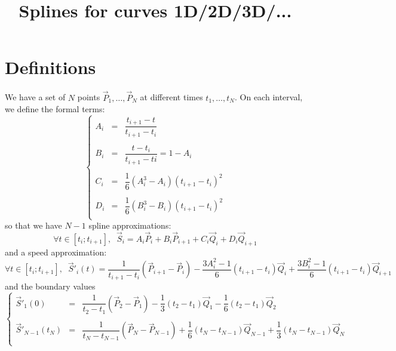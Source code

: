 \documentclass[aps,11pt]{revtex4}
\begin{document}
\title{Splines for curves 1D/2D/3D/...}
\maketitle

\section{Definitions}
We have a set of $N$ points $\vec{P}_1,\ldots,\vec{P}_N$ at different times $t_1,\ldots,t_N$.
On each interval, we define the formal terms:
\begin{equation}
\left\lbrace
\begin{array}{rcl}
	A_i & = &\dfrac{t_{i+1}-t}{t_{i+1}-t_{i}}\\
	\\
	B_i & = &\dfrac{t-t_{i}}{t_{i+1}-t{i}} = 1-A_i\\
	\\
	C_i & = & \dfrac{1}{6}\left(A_i^3-A_i\right)\left(t_{i+1}-t_{i}\right)^2\\
	\\
	D_i & = & \dfrac{1}{6}\left(B_i^3-B_i\right)\left(t_{i+1}-t_{i}\right)^2\\
\end{array}
\right.
\end{equation}
so that we have  $N-1$ spline approximations:
\begin{equation}
	\forall t \in [t_{i};t_{i+1}], \;\; \vec{S}_i = A_i \vec{P}_{i} + B_i \vec{P}_{i+1} + C_i \vec{Q}_i + D_i \vec{Q}_{i+1}
\end{equation}
and a speed approximation:
\begin{equation}	
		\forall t \in [t_{i};t_{i+1}],
		 \;\; \vec{S}'_i(t) = 
		 \dfrac{1}{t_{i+1}-t_{i}} \left(\vec{P}_{i+1}-\vec{P}_i\right)
		  - \dfrac{3A_i^2-1}{6}(t_{i+1}-t_{i}) \vec{Q}_i
		  + \dfrac{3B_i^2-1}{6}(t_{i+1}-t_{i}) \vec{Q}_{i+1}
\end{equation}
and the boundary values
\begin{equation}
\left\lbrace
\begin{array}{rcl}
	\vec{S}'_1(0) & = & \dfrac{1}{t_{2}-t_{1}} \left(\vec{P}_{2}-\vec{P}_1\right)
		  - \dfrac{1}{3}(t_{2}-t_{1}) \vec{Q}_1
		  - \dfrac{1}{6}(t_{2}-t_{1}) \vec{Q}_{2}\\
		  \\
		 \vec{S}'_{N-1}(t_N) & = &  \dfrac{1}{t_{N}-t_{N-1}} \left(\vec{P}_{N}-\vec{P}_{N-1}\right)  + \dfrac{1}{6}(t_{N}-t_{N-1}) \vec{Q}_{N-1}
		  + \dfrac{1}{3}(t_{N}-t_{N-1}) \vec{Q}_{N} \\
\end{array}
\right.
\end{equation}
\end{document}
